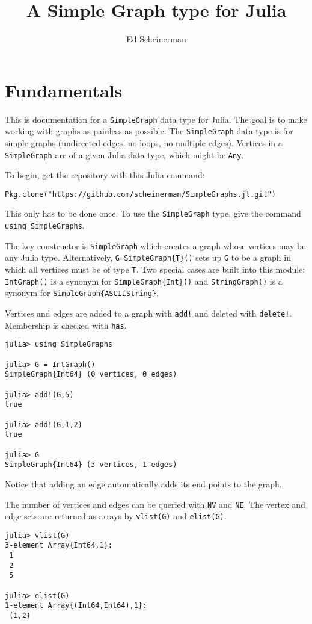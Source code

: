 \documentclass[oneside]{amsart}
\title{A Simple Graph type for Julia}
\author{Ed Scheinerman}
\begin{document}
\maketitle


\section{Fundamentals}

This is documentation for a \verb|SimpleGraph| data type for Julia. The
goal is to make working with graphs as painless as possible. The
\verb|SimpleGraph| data type is for simple graphs (undirected edges, no
loops, no multiple edges). Vertices in a \verb|SimpleGraph| are of a
given Julia data type, which might be \verb|Any|.

To begin, get the repository with this Julia command:
\begin{verbatim}
Pkg.clone("https://github.com/scheinerman/SimpleGraphs.jl.git")
\end{verbatim}
This only has to be done once. To use the \verb|SimpleGraph| type,
give the command \verb|using SimpleGraphs|.


The key constructor is
\verb|SimpleGraph| which creates a graph whose vertices may be any Julia
type. Alternatively, \verb|G=SimpleGraph{T}()| sets up \verb|G| to be a
graph in which all vertices must be of type \verb|T|. Two special
cases are built into this module: \verb|IntGraph()| is a synonym for
\verb|SimpleGraph{Int}()| and \verb|StringGraph()| is a synonym for
\verb|SimpleGraph{ASCIIString}|.

Vertices and edges are added to a graph with \verb|add!| and deleted
with \verb|delete!|. Membership is checked with \verb|has|.
\begin{verbatim}
julia> using SimpleGraphs

julia> G = IntGraph()
SimpleGraph{Int64} (0 vertices, 0 edges)

julia> add!(G,5)
true

julia> add!(G,1,2)
true

julia> G
SimpleGraph{Int64} (3 vertices, 1 edges)
\end{verbatim}
Notice that adding an edge automatically adds its end points to the
graph.

The number of vertices and edges can be queried with \verb|NV| and
\verb|NE|. The vertex and edge sets are returned as arrays by
\verb|vlist(G)| and \verb|elist(G)|.
\begin{verbatim}
julia> vlist(G)
3-element Array{Int64,1}:
 1
 2
 5

julia> elist(G)
1-element Array{(Int64,Int64),1}:
 (1,2)
\end{verbatim}
\end{document}
